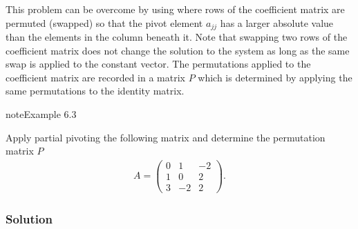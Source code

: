 \documentclass[letterpaper,10pt,english]{jupyterBook}
\begin{document}
\sphinxAtStartPar
This problem can be overcome by using  where rows of the coefficient matrix are permuted (swapped) so that the pivot element \(a_{jj}\) has a larger absolute value than the elements in the column beneath it. Note that swapping two rows of the coefficient matrix does not change the solution to the system as long as the same swap is applied to the constant vector. The permutations applied to the coefficient matrix are recorded in a matrix \(P\) which is determined by applying the same permutations to the identity matrix.

\begin{sphinxadmonition}{note}{Example 6.3}

\sphinxAtStartPar
Apply partial pivoting the following matrix and determine the permutation matrix \(P\)
\begin{align*}
    A =\begin{pmatrix}
        0 & 1 & -2\\
        1 & 0 & 2\\
        3 & -2 & 2
    \end{pmatrix}.
\end{align*}\subsubsection*{Solution}


\end{sphinxadmonition}
\end{document}
